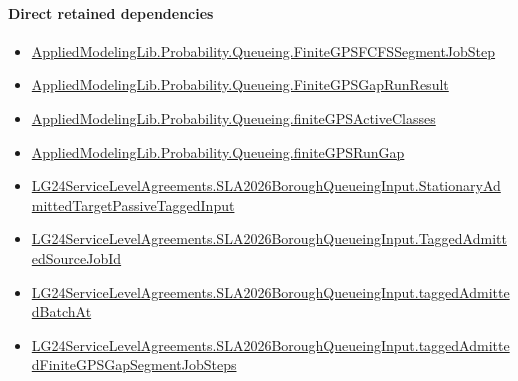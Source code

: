 \documentclass[10pt]{article}
\begin{document}
\paragraph{Direct retained dependencies}
\begin{itemize}\raggedright
\item \hyperlink{governing-declaration-8fcaf575fc5b34e1}{Applied\allowbreak{}Modeling\allowbreak{}Lib.\allowbreak{}Probability.\allowbreak{}Queueing.\allowbreak{}Finite\allowbreak{}GPSFCFS\allowbreak{}Segment\allowbreak{}Job\allowbreak{}Step}
\item \hyperlink{governing-declaration-c9a7944bee91fb5d}{Applied\allowbreak{}Modeling\allowbreak{}Lib.\allowbreak{}Probability.\allowbreak{}Queueing.\allowbreak{}Finite\allowbreak{}GPS\allowbreak{}Gap\allowbreak{}Run\allowbreak{}Result}
\item \hyperlink{governing-declaration-c54ef048a5ce0276}{Applied\allowbreak{}Modeling\allowbreak{}Lib.\allowbreak{}Probability.\allowbreak{}Queueing.\allowbreak{}finite\allowbreak{}GPS\allowbreak{}Active\allowbreak{}Classes}
\item \hyperlink{governing-declaration-cf88d64d8dfce082}{Applied\allowbreak{}Modeling\allowbreak{}Lib.\allowbreak{}Probability.\allowbreak{}Queueing.\allowbreak{}finite\allowbreak{}GPS\allowbreak{}Run\allowbreak{}Gap}
\item \hyperlink{governing-declaration-8796a25a610eaea9}{LG24\allowbreak{}Service\allowbreak{}Level\allowbreak{}Agreements.\allowbreak{}SLA2026\allowbreak{}Borough\allowbreak{}Queueing\allowbreak{}Input.\allowbreak{}Stationary\allowbreak{}Admitted\allowbreak{}Target\allowbreak{}Passive\allowbreak{}Tagged\allowbreak{}Input}
\item \hyperlink{governing-declaration-03f187b908407c39}{LG24\allowbreak{}Service\allowbreak{}Level\allowbreak{}Agreements.\allowbreak{}SLA2026\allowbreak{}Borough\allowbreak{}Queueing\allowbreak{}Input.\allowbreak{}Tagged\allowbreak{}Admitted\allowbreak{}Source\allowbreak{}Job\allowbreak{}Id}
\item \hyperlink{governing-declaration-802a7f71e8b46c56}{LG24\allowbreak{}Service\allowbreak{}Level\allowbreak{}Agreements.\allowbreak{}SLA2026\allowbreak{}Borough\allowbreak{}Queueing\allowbreak{}Input.\allowbreak{}tagged\allowbreak{}Admitted\allowbreak{}Batch\allowbreak{}At}
\item \hyperlink{governing-declaration-99e3edf6980d4f35}{LG24\allowbreak{}Service\allowbreak{}Level\allowbreak{}Agreements.\allowbreak{}SLA2026\allowbreak{}Borough\allowbreak{}Queueing\allowbreak{}Input.\allowbreak{}tagged\allowbreak{}Admitted\allowbreak{}Finite\allowbreak{}GPS\allowbreak{}Gap\allowbreak{}Segment\allowbreak{}Job\allowbreak{}Steps}
\end{itemize}
\hypertarget{governing-declaration-f4da7440d5fb1739}{}
\end{document}
